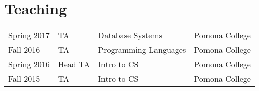 \documentclass[]{deedy-resume-openfont}
\begin{document}
\begin{minipage}[t]{0.66\textwidth}



\section{Teaching} 

\begin{tabular}{llll}
  Spring 2017 & TA      & Database Systems & Pomona College \\
  Fall   2016 & TA      & Programming Languages & Pomona College \\
  Spring 2016 & Head TA & Intro to CS & Pomona College \\
  Fall   2015 &  TA     & Intro to CS & Pomona College
\end{tabular}
\sectionsep

\end{minipage} 
\end{document}
